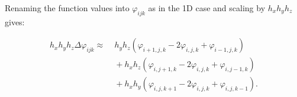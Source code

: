 Renaming the function values into $\varphi_{ijk}$ as in the 1D case and scaling by \(h_x h_y h_z\) gives:

\begin{align*}
h_x h_y h_z \Delta \varphi_{ijk} \approx
&\;  h_y h_z (\varphi_{i+1, j, k} - 2\varphi_{i, j, k} + \varphi_{i-1, j, k}) \\
& \; + h_x h_z (\varphi_{i, j+1, k} - 2\varphi_{i, j, k} + \varphi_{i, j-1, k}) \\
&\; + h_x h_y (\varphi_{i, j, k+1} - 2\varphi_{i, j, k} + \varphi_{i, j, k-1}).
\end{align*}


\FloatBarrier





